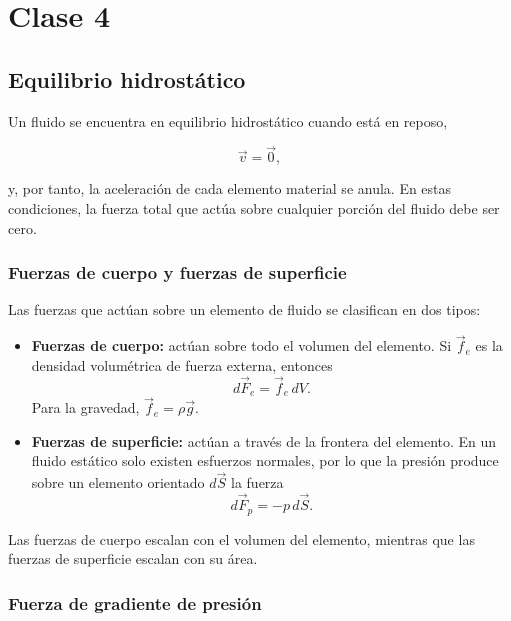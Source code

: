 \shorthandoff{<>}







\shorthandon{<>}

\chapter{Clase 4}

\section{Equilibrio hidrostático}

Un fluido se encuentra en equilibrio hidrostático cuando está en reposo,

$$
\vec{v}=\vec{0},
$$

y, por tanto, la aceleración de cada elemento material se anula. En estas
condiciones, la fuerza total que actúa sobre cualquier porción del fluido debe
ser cero.

\subsection{Fuerzas de cuerpo y fuerzas de superficie}

Las fuerzas que actúan sobre un elemento de fluido se clasifican en dos tipos:

\begin{itemize}
    \item \textbf{Fuerzas de cuerpo:} actúan sobre todo el volumen del
    elemento. Si $\vec{f}_e$ es la densidad volumétrica de fuerza externa,
    entonces
    $$
    d\vec{F}_e=\vec{f}_e\,dV.
    $$
    Para la gravedad, $\vec{f}_e=\rho\vec{g}$.

    \item \textbf{Fuerzas de superficie:} actúan a través de la frontera del
    elemento. En un fluido estático solo existen esfuerzos normales, por lo
    que la presión produce sobre un elemento orientado $d\vec{S}$ la fuerza
    $$
    d\vec{F}_p=-p\,d\vec{S}.
    $$
\end{itemize}

Las fuerzas de cuerpo escalan con el volumen del elemento, mientras que las
fuerzas de superficie escalan con su área.

\subsection{Fuerza de gradiente de presión}

